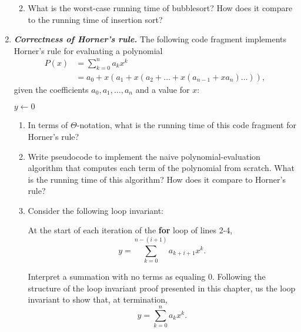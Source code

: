 \documentclass[Chapter02]{subfiles}
\begin{document}
\begin{enumerate}[leftmargin=\labelsep,label={\textbf{\thesection-\arabic*}}]
\begin{enumerate}[resume]
\begin{answer}
			\end{answer}
			
			\item What is the worst-case running time of bubblesort? How does it compare to the running time of insertion sort?
			\begin{answer}
				
			\end{answer}
			
		\end{enumerate}
		
		\item \textbf{\textit{Correctness of Horner's rule.}} The following code fragment implements Horner's rule for evaluating a polynomial
		\begin{align*}
			P(x) &= \sum_{k = 0}^n a_kx^k\\
				&= a_0 + x(a_1 + x(a_2 + \dots + x(a_{n - 1} + xa_n) \dots)),
		\end{align*}
		given the coefficients $a_0, a_1, \dots, a_n$ and a value for $x$:

		\begin{algorithm}[H]
			$y \leftarrow 0$\;
		\end{algorithm}
		\begin{enumerate}
			\item In terms of $\Theta$-notation, what is the running time of this code fragment for Horner's rule?
			\begin{answer}
				
			\end{answer}

			\item Write pseudocode to implement the naive polynomial-evaluation algorithm that computes each term of the polynomial from scratch. What is the running time of this algorithm? How does it compare to Horner's rule?
			\begin{answer}
				
			\end{answer}
			
			\item Consider the following loop invariant:
			\begin{addmargin}[2em]{2em}
				At the start of each iteration of the \textbf{for} loop of lines 2-4,
				\[
					y = \sum_{k = 0}^{n - (i + 1)} a_{k + i + 1}x^k.
				\]
			\end{addmargin}
			Interpret a summation with no terms as equaling 0. Following the structure of the loop invariant proof presented in this chapter, us the loop invariant to show that, at termination,
			\[
				y = \sum_{k = 0}^n a_kx^k.
			\]
			\begin{answer}
				

\end{answer}
\end{enumerate}
\end{enumerate}
\end{document}
